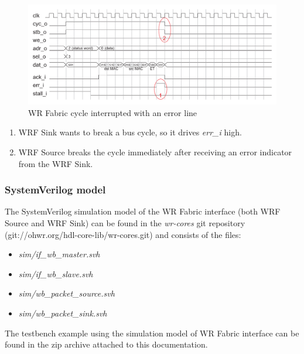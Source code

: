\begin{figure}
  \begin{center}
    \includegraphics[width=\textwidth]{fig/basic_wrf_cycle_err.pdf}
    \caption{WR Fabric cycle interrupted with an error line}
    \label{fig:fabric:cycerr}
  \end{center}
\end{figure}

\begin{enumerate}
  \item WRF Sink wants to break a bus cycle, so it drives \emph{err\_i} high.
  \item WRF Source breaks the cycle immediately after receiving an error indicator
    from the WRF Sink.
\end{enumerate}

\subsubsection{SystemVerilog model}
The SystemVerilog simulation model of the WR Fabric interface (both WRF Source and 
WRF Sink) can be found in the \emph{wr-cores} git repository
(git://ohwr.org/hdl-core-lib/wr-cores.git) and consists of the files:
\begin{itemize}
  \item \emph{sim/if\_wb\_master.svh}
  \item \emph{sim/if\_wb\_slave.svh}
  \item \emph{sim/wb\_packet\_source.svh}
  \item \emph{sim/wb\_packet\_sink.svh}
\end{itemize}

The testbench example using the simulation model of WR Fabric interface can
be found in the zip archive attached to this documentation.

